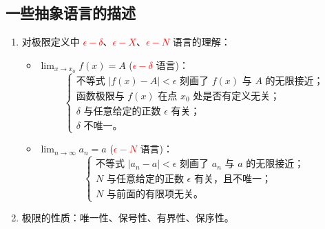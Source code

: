 \documentclass[a4paper,12pt]{ctexart} %
\begin{document}
\subsection{一些抽象语言的描述}
\begin{enumerate}
    \item 对极限定义中 \textcolor{red}{$\epsilon - \delta$}、\textcolor{red}{$\epsilon - X$}、\textcolor{red}{$\epsilon - N$} 语言的理解：
    \begin{itemize}
        \item $\lim_{x \to x_0} f(x) = A$ (\textcolor{red}{$\epsilon - \delta$} 语言)：
        \[
        \begin{cases}
        \text{不等式 } |f(x) - A| < \epsilon \text{ 刻画了 } f(x) \text{ 与 } A \text{ 的无限接近；} \\
        \text{函数极限与 } f(x) \text{ 在点 } x_0 \text{ 处是否有定义无关；} \\
        \delta \text{ 与任意给定的正数 } \epsilon \text{ 有关；} \\
        \delta \text{ 不唯一。}
        \end{cases}
        \]
        \item $\lim_{n \to \infty} a_n = a$ (\textcolor{red}{$\epsilon - N$} 语言)：
        \[
        \begin{cases}
        \text{不等式 } |a_n - a| < \epsilon \text{ 刻画了 } a_n \text{ 与 } a \text{ 的无限接近；} \\
        N \text{ 与任意给定的正数 } \epsilon \text{ 有关，且不唯一；} \\
        N \text{ 与前面的有限项无关。}
        \end{cases}
        \]
    \end{itemize}
    \item 极限的性质：唯一性、保号性、有界性、保序性。
\end{enumerate}
\end{document}
